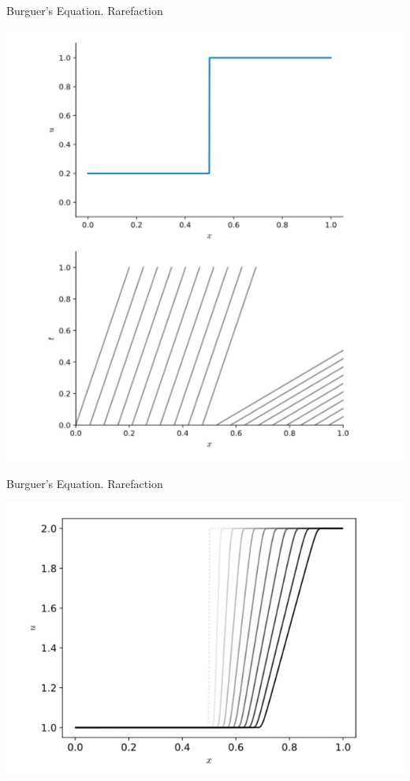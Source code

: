 \documentclass[11pt]{beamer}
\begin{document}
\begin{frame}[fragile]{Burguer's Equation. Rarefaction}
\begin{center}
\includegraphics[scale=0.3]{burguerscharact2}
\end{center}
\end{frame}

\begin{frame}[fragile]{Burguer's Equation. Rarefaction}
\begin{center}
\includegraphics[scale=0.3]{burguersrarefaction}
\end{center}
\end{frame}
\end{document}
